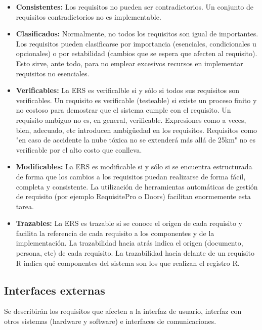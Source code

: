 \documentclass[12pt,a4paper, twosite]{book}
\begin{document}
\begin{itemize}
\begin{itemize}
\item \textbf{Consistentes:} Los requisitos no pueden ser contradictorios. Un
conjunto de requisitos contradictorios no es implementable.

\item \textbf{Clasificados:} Normalmente, no todos los requisitos son igual de
importantes. Los requisitos pueden clasificarse por importancia
(esenciales, condicionales u opcionales) o por estabilidad (cambios
que se espera que afecten al requisito). Esto sirve, ante todo,
para no emplear excesivos recursos en implementar requisitos no
esenciales.

\item \textbf{Verificables:} La ERS es verificalble si y sólo si todos sus
requisitos son verificables. Un requisito es verificable
(testeable) si existe un proceso finito y no costoso para
demostrar que el sistema cumple con el requisito. Un requisito
ambiguo no es, en general, verificable. Expresiones como a veces,
bien, adecuado, etc introducen ambigüedad en los
requisitos. Requisitos como "en caso de accidente la nube tóxica
no se extenderá más allá de 25km" no es verificable por el alto
costo que conlleva.

\item \textbf{Modificables:} La ERS es modificable si y sólo si se encuentra
estructurada de forma que los cambios a los requisitos puedan
realizarse de forma fácil, completa y consistente. La utilización
de herramientas automáticas de gestión de requisito (por ejemplo
RequisitePro o Doors) facilitan enormemente esta tarea.

\item \textbf{Trazables:} La ERS es trazable si se conoce el origen de cada
requisito y facilita la referencia de cada requisito a los
componentes y de la implementación. La trazabilidad hacia atrás
indica el origen (documento, persona, etc) de cada requisito. La
trazabilidad hacia delante de un requisito R indica qué
componentes del sistema son los que realizan el registro R.
\end{itemize}
\end{itemize}


\subsection{Interfaces externas}
\label{sec:orgfd5391f}

Se describirán los requisitos que afecten a la interfaz de usuario,
interfaz con otros sistemas (hardware y software) e interfaces de comunicaciones.
\end{document}
